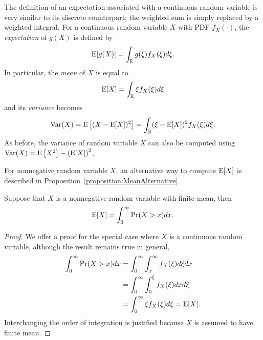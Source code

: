 The definition of an expectation associated with a continuous random variable is very similar to its discrete counterpart;
the weighted sum is simply replaced by a weighted integral.
For a continuous random variable $X$ with PDF $f_X(\cdot)$, the \emph{expectation} of $g(X)$ is defined by 
\begin{equation*}
\mathrm{E} [g(X)]
= \int_{\mathbb{R}} g(\xi) f_X (\xi) d\xi .
\end{equation*}
In particular, the \emph{mean} of $X$ is equal to 
\begin{equation*}
\mathrm{E} [X]
= \int_{\mathbb{R}} \xi f_X (\xi) d\xi
\end{equation*}
and its \emph{variance} becomes 
\begin{equation*}
\mathrm{Var} (X) = \mathrm{E} \left[ (X - \mathrm{E}[X])^2 \right]
= \int_{\mathbb{R}} (\xi - \mathrm{E}[X])^2 f_X (\xi) d\xi .
\end{equation*}
As before, the variance of random variable $X$ can also be computed using $\mathrm{Var}(X) = \mathrm{E} \left[ X^2 \right] - \left( \mathrm{E} [X] \right)^2$.



For nonnegative random variable $X$, an alternative way to compute $\mathrm{E} [X]$ is described in Proposition~\ref{proposition:MeanAlternative}. 

\begin{proposition} \label{proposition:MeanAlternative}
Suppose that $X$ is a nonnegative random variable with finite mean, then
\begin{equation*}
\mathrm{E} [X] = \int_0^{\infty} \Pr (X > x) dx .
\end{equation*}
\end{proposition}
\begin{proof}
We offer a proof for the special case where $X$ is a continuous random variable, although the result remains true in general,
\begin{equation*}
\begin{split}
\int_0^{\infty} \Pr (X > x) dx
&= \int_0^{\infty} \int_x^{\infty} f_X(\xi) d\xi dx \\
&= \int_0^{\infty} \int_0^{\xi} f_X(\xi) dx d\xi \\
&= \int_0^{\infty} \xi f_X(\xi) d\xi
= \mathrm{E} [X] .
\end{split}
\end{equation*}
Interchanging the order of integration is justified because $X$ is assumed to have finite mean.
\end{proof}

